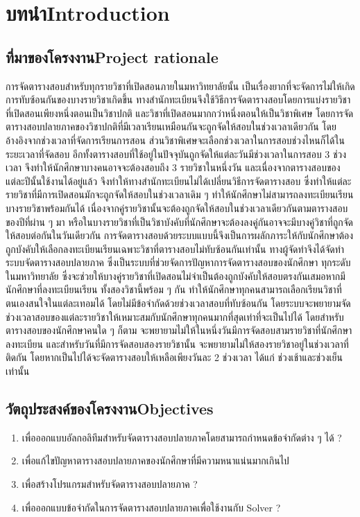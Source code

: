\chapter{\ifcpe บทนำ\else Introduction\fi}

\section{\ifcpe ที่มาของโครงงาน\else Project rationale\fi}


การจัดตารางสอบสำหรับทุกรายวิชาที่เปิดสอนภายในมหาวิทยาลัยนั้น
เป็นเรื่องยากที่จะจัดการไม่ให้เกิดการทับซ้อนกันของบางรายวิชาเกิดขึ้น
ทางสำนักทะเบียนจึงใช้วิธีการจัดตารางสอบโดยการแบ่งรายวิชาที่เปิดสอนเพียงหนึ่งตอนเป็นวิชาปกติ
และวิชาที่เปิดสอนมากกว่าหนึ่งตอนให้เป็นวิชาพิเศษ
โดยการจัดตารางสอบปลายภาคของวิชาปกติที่มีเวลาเรียนเหมือนกันจะถูกจัดให้สอบในช่วงเวลาเดียวกัน
โดยอ้างอิงจากช่วงเวลาที่จัดการเรียนการสอน ส่วนวิชาพิเศษจะเลือกช่วงเวลาในการสอบช่วงไหนก็ได้ในระยะเวลาที่จัดสอบ
อีกทั้งตารางสอบที่ใช้อยู่ในปัจจุบันถูกจัดให้แต่ละวันมีช่วงเวลาในการสอบ 3 ช่วงเวลา
จึงทำให้นักศึกษาบางคนอาจจะต้องสอบถึง 3 รายวิชาในหนึ่งวัน และเนื่องจากตารางสอบของแต่ละปีนั้นใช้งานได้อยู่แล้ว
จึงทำให้ทางสำนักทะเบียนไม่ได้เปลี่ยนวิธีการจัดตารางสอบ ซึ่งทำให้แต่ละรายวิชาที่มีการเปิดสอนมักจะถูกจัดให้สอบในช่วงเวลาเดิม ๆ
ทำให้นักศึกษาไม่สามารถลงทะเบียนเรียนบางรายวิชาพร้อมกันได้ เนื่องจากคู่รายวิชานั้นจะต้องถูกจัดให้สอบในช่วงเวลาเดียวกันตามตารางสอบของปีที่ผ่าน ๆ มา 
หรือในบางรายวิชาที่เป็นวิชาบังคับที่นักศึกษาจะต้องลงคู่กันอาจจะมีบางคู่วิชาที่ถูกจัดให้สอบต่อกันในวันเดียวกัน
การจัดตารางสอบด้วยระบบแบบนี้จึงเป็นการผลักภาระให้กับนักศึกษาต้องถูกบังคับให้เลือกลงทะเบียนเรียนเฉพาะวิชาที่ตารางสอบไม่ทับซ้อนกันเท่านั้น 
ทางผู้จัดทำจึงได้จัดทำระบบจัดตารางสอบปลายภาค ซึ่งเป็นระบบที่ช่วยจัดการปัญหาการจัดตารางสอบของนักศึกษา
ทุกระดับในมหาวิทยาลัย ซึ่งจะช่วยให้บางคู่รายวิชาที่เปิดสอนไม่จำเป็นต้องถูกบังคับให้สอบตรงกันเสมอหากมีนักศึกษาที่ลงทะเบียนเรียน
ทั้งสองวิชานี้พร้อม ๆ กัน ทำให้นักศึกษาทุกคนสามารถเลือกเรียนวิชาที่ตนเองสนใจในแต่ละเทอมได้ โดยไม่มีข้อจำกัดด้วยช่วงเวลาสอบที่ทับซ้อนกัน
โดยระบบจะพยายามจัดช่วงเวลาสอบของแต่ละรายวิชาให้เหมาะสมกับนักศึกษาทุกคนมากที่สุดเท่าที่จะเป็นไปได้ โดยสำหรับตารางสอบของนักศึกษาคนใด ๆ ก็ตาม 
จะพยายามไม่ให้ในหนึ่งวันมีการจัดสอบสามรายวิชาที่นักศึกษาลงทะเบียน และสำหรับวันที่มีการจัดสอบสองรายวิชานั้น จะพยายามไม่ให้สองรายวิชาอยู่ในช่วงเวลาที่ติดกัน
โดยหากเป็นไปได้จะจัดตารางสอบให้เหลือเพียงวันละ 2 ช่วงเวลา ได้แก่ ช่วงเช้าและช่วงเย็นเท่านั้น
\section{\ifcpe วัตถุประสงค์ของโครงงาน\else Objectives\fi}
\begin{enumerate}
    \item เพื่อออกแบบอัลกอลิทึมสำหรับจัดตารางสอบปลายภาคโดยสามารถกำหนดข้อจำกัดต่าง ๆ ได้ ?
    \item เพื่อแก้ไขปัญหาตารางสอบปลายภาคของนักศึกษาที่มีความหนาแน่นมากเกินไป
    \item เพื่อสร้างโปรแกรมสำหรับจัดตารางสอบปลายภาค ?
    \item เพื่อออกแบบข้อจำกัดในการจัดตารางสอบปลายภาคเพื่อใช้งานกับ Solver ?
\end{enumerate}

